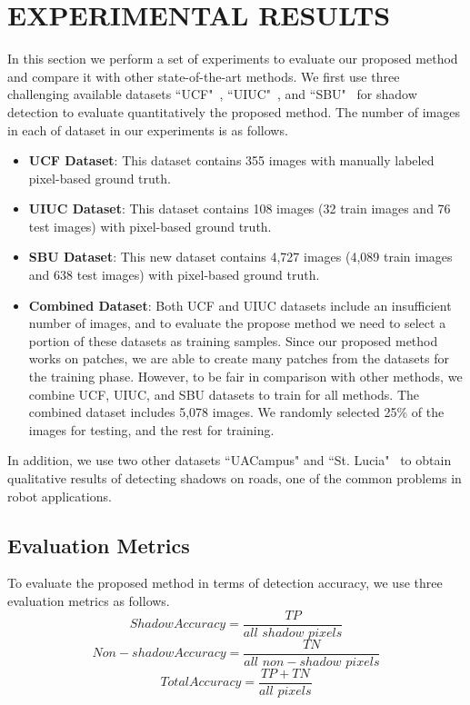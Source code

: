 \documentclass[letterpaper, 10 pt, conference]{ieeeconf}
\begin{document}
\section{EXPERIMENTAL RESULTS}
\label{results}
In this section we perform a set of experiments to evaluate our proposed method and compare it with other state-of-the-art methods. We first use three challenging available datasets ``UCF"~\cite{Zhu}, ``UIUC"~\cite{Gue}, and ``SBU"~\cite{Vicente2} for shadow detection to evaluate quantitatively the proposed method. The number of images in each of dataset in our experiments is as follows.
\begin{itemize}
\item{\textbf{UCF Dataset}}: This dataset contains 355 images with manually labeled pixel-based ground  truth.\\
\item{\textbf{UIUC Dataset}}: This dataset contains 108 images (32 train images and 76 test images) with pixel-based ground truth.\\
\item{\textbf{SBU Dataset}}: This new dataset contains 4,727 images (4,089 train images and 638 test images) with pixel-based ground truth.\\
\item{\textbf{Combined Dataset}}: Both UCF and UIUC datasets include an insufficient number of images, and to evaluate the propose method we need to select a portion of these datasets as training samples. Since our proposed method works on patches, we are able to create many patches from the datasets for the training phase. However, to be fair in comparison with other methods, we combine UCF, UIUC, and SBU datasets to train for all methods. The combined dataset includes 5,078 images. We randomly selected 25\% of the images for testing, and the rest for training. 
\end{itemize}

In addition, we use two other datasets ``UACampus" and ``St. Lucia"~\cite{Lucia} to obtain qualitative results of detecting shadows on roads, one of the common problems in robot applications.

\subsection{Evaluation Metrics}
\label{evaluation}
To evaluate the proposed method in terms of detection accuracy, we use three evaluation metrics as follows.
\begin{equation}
Shadow Accuracy =\frac{TP}{all\,\, shadow\,\, pixels}
\end{equation}
\begin{equation}
Non-shadow Accuracy = \frac{TN}{all\,\, non-shadow\,\,pixels}
\end{equation}
\begin{equation}
Total Accuracy = \frac{TP+TN}{all\,\,pixels}
\end{equation}
\end{document}
